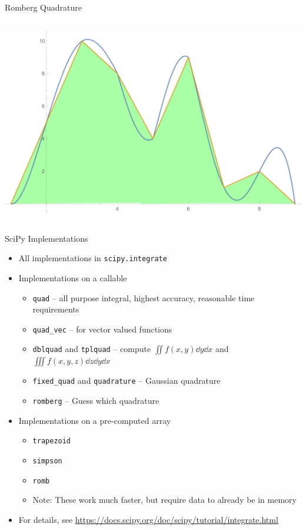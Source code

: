 \begin{frame}{Romberg Quadrature}
\begin{columns}
\includegraphics[width=\linewidth]{./gfx/03-romberg-03}
\end{columns}
%
\end{frame}


\begin{frame}{SciPy Implementations}
%
\begin{itemize}
\item All implementations in \texttt{scipy.integrate}
\item Implementations on a callable
	\begin{itemize}
	\item \texttt{quad} -- all purpose integral, highest accuracy, reasonable time requirements
	\item \texttt{quad\_vec} -- for vector valued functions
	\item \texttt{dblquad} and \texttt{tplquad} -- compute $\iint f(x, y) \dd{y}\dd{x}$ and $\iiint f(x, y, z) \dd{z}\dd{y}\dd{x}$
	\item \texttt{fixed\_quad} and \texttt{quadrature} -- Gaussian quadrature
	\item \texttt{romberg} -- Guess which quadrature
	\end{itemize}
\item Implementations on a pre-computed array
	\begin{itemize}
	\item \texttt{trapezoid}
	\item \texttt{simpson}
	\item \texttt{romb}
	\item Note: These work much faster, but require data to already be in memory
	\end{itemize}
\item For details, see \url{https://docs.scipy.org/doc/scipy/tutorial/integrate.html} 
\end{itemize}
%
\end{frame}

